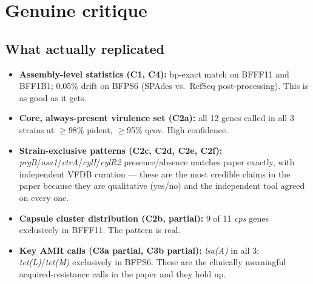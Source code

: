 \documentclass[11pt]{article}
\begin{document}
\section{Genuine critique}
\label{sec:critique}

\subsection{What actually replicated}
\begin{itemize}
  \item \textbf{Assembly-level statistics (C1, C4):} bp-exact match on BFFF11 and BFF1B1; 0.05\% drift on BFPS6 (SPAdes vs.\ RefSeq post-processing). This is as good as it gets.
  \item \textbf{Core, always-present virulence set (C2a):} all 12 genes called in all 3 strains at $\geq$98\% pident, $\geq$95\% qcov. High confidence.
  \item \textbf{Strain-exclusive patterns (C2c, C2d, C2e, C2f):} \emph{prgB}/\emph{asa1}/\emph{ctrA}/\emph{cylI}/\emph{cylR2} presence/absence matches paper exactly, with independent VFDB curation --- these are the most credible claims in the paper because they are qualitative (yes/no) and the independent tool agreed on every one.
  \item \textbf{Capsule cluster distribution (C2b, partial):} 9 of 11 \emph{cps} genes exclusively in BFFF11. The pattern is real.
  \item \textbf{Key AMR calls (C3a partial, C3b partial):} \emph{lsa(A)} in all 3; \emph{tet(L)}/\emph{tet(M)} exclusively in BFPS6. These are the clinically meaningful acquired-resistance calls in the paper and they hold up.
\end{itemize}
\end{document}
